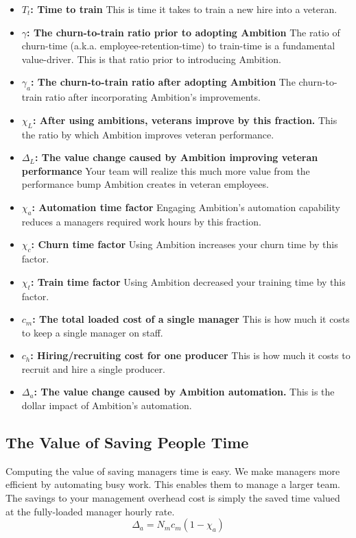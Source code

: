 \documentclass[paper=a4, fontsize=11pt abstract]{scrartcl}
\numberwithin{equation}{section}		%
\numberwithin{figure}{section}			%
\numberwithin{table}{section}				%
\begin{document}
\begin{itemize}
    \item $T_t$\textbf{: Time to train} This is time it takes to train a new hire into a veteran.
    
    \item $\gamma$\textbf{: The churn-to-train ratio prior to adopting Ambition} The ratio of churn-time (a.k.a. employee-retention-time) to train-time is a fundamental value-driver.  This is that ratio prior to introducing Ambition.
    
    \item $\gamma_a$\textbf{: The churn-to-train ratio after adopting Ambition} The churn-to-train ratio after incorporating Ambition's improvements.
    
    \item $\chi_L$\textbf{: After using ambitions, veterans improve by this fraction.} This the ratio by which Ambition improves veteran performance.
    
    \item $\Delta_L$\textbf{: The value change caused by Ambition improving veteran performance} Your team will realize this much more value from the performance bump Ambition creates in veteran employees.
    
    \item $\chi_a$\textbf{: Automation time factor} Engaging Ambition's automation capability reduces a managers required work hours by this fraction.
    
    \item $\chi_c$\textbf{: Churn time factor} Using Ambition increases your churn time by this factor.
    
    \item $\chi_t$\textbf{: Train time factor} Using Ambition decreased your training time by this factor.
    
    \item $c_m$\textbf{: The total loaded cost of a single manager} This is how much it costs to keep a single manager on staff.
    
    \item $c_h$\textbf{: Hiring/recruiting cost for one producer} This is how much it costs to recruit and hire a single producer.
    
    \item $\Delta_a$\textbf{: The value change caused by Ambition automation.} This is the dollar impact of Ambition's automation.
\end{itemize}


\subsection{The Value of Saving People Time}
Computing the value of saving managers time is easy.
We make managers more efficient by automating busy work.
This enables them to manage a larger team.
The savings to your management overhead cost is simply the saved time valued at the fully-loaded manager hourly rate.
\begin{equation}
    \Delta_a = N_m c_m \left(1 - \chi_a\right)
\end{equation}
\end{document}

